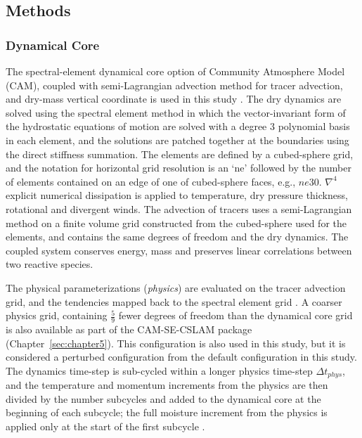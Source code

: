 \subsection{Methods}

\subsubsection{Dynamical Core}

The spectral-element dynamical core option of Community Atmosphere Model (CAM), coupled with semi-Lagrangian advection method for tracer advection, and dry-mass vertical coordinate is used in this study \citep{LTOUNGK2017MWR,LetAl2018JAMES,HL2018MWR}. The dry dynamics are solved using the spectral element method in which the vector-invariant form of the hydrostatic equations of motion are solved with a degree 3 polynomial basis in each element, and the solutions are patched together at the boundaries using the direct stiffness summation. The elements are defined by a cubed-sphere grid, and the notation for horizontal grid resolution is an `ne' followed by the number of elements contained on an edge of one of cubed-sphere faces, e.g., $ne30$. $\nabla^{4}$ explicit numerical dissipation is applied to temperature, dry pressure thickness, rotational and divergent winds. The advection of tracers uses a semi-Lagrangian method on a finite volume grid constructed from the cubed-sphere used for the elements, and contains the same degrees of freedom and the dry dynamics. The coupled system conserves energy, mass and preserves linear correlations between two reactive species.

The physical parameterizations ({\em{physics}}) are evaluated on the tracer advection grid, and the tendencies mapped back to the spectral element grid \citep{HL2018MWR}. A coarser physics grid, containing $\frac{5}{9}$ fewer degrees of freedom than the dynamical core grid is also available as part of the CAM-SE-CSLAM package (Chapter~\ref{sec:chapter5}). This configuration is also used in this study, but it is considered a perturbed configuration from the default configuration in this study. The dynamics time-step is sub-cycled within a longer physics time-step $\Delta t_{phys}$, and the temperature and momentum increments from the physics are then divided by the number subcycles and added to the dynamical core at the beginning of each subcycle; the full moisture increment from the physics is applied only at the start of the first subcycle \citep[$ftype=2$ option in][]{LW2019JAMES}. 

